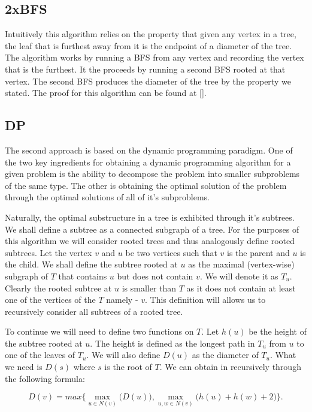 \subsection{2xBFS}

Intuitively this algorithm relies on the property that given any vertex in a tree, the leaf that is furthest away from it is the endpoint of a diameter of the tree. The algorithm works by running a BFS from any vertex and recording the vertex that is the furthest. It the proceeds by running a second BFS rooted at that vertex. The second BFS produces the diameter of the tree by the property we stated. The proof for this algorithm can be found at [].

\subsection{DP}

The second approach is based on the dynamic programming paradigm. One of the two key ingredients for obtaining a dynamic programming algorithm for a given problem is the ability to decompose the problem into smaller subproblems of the same type. The other is obtaining the optimal solution of the problem through the optimal solutions of all of it's subproblems. 

Naturally, the optimal substructure in a tree is exhibited through it's subtrees. We shall define a subtree as a connected subgraph of a tree. For the purposes of this algorithm we will consider rooted trees and thus analogously define rooted subtrees. Let the vertex $v$ and $u$ be two vertices such that $v$ is the parent and $u$ is the child. We shall define the subtree rooted at $u$ as the maximal (vertex-wise) subgraph of $T$ that contains $u$ but does not contain $v$. We will denote it as $T_u$. Clearly the rooted subtree at $u$ is smaller than $T$ as it does not contain at least one of the vertices of the $T$ namely - $v$. This definition will allows us to recursively consider all subtrees of a rooted tree.

To continue we will need to define two functions on $T$. Let $h(u)$ be the height of the subtree rooted at $u$. The height is defined as the longest path in $T_u$ from $u$ to one of the leaves of $T_u$. We will also define $D(u)$ as the diameter of $T_u$. What we need is $D(s)$ where $s$ is the root of $T$. We can obtain in recursively through the following formula:

$$ D(v) = max\bigg\{ \max\limits_{u \in N(v)}\bigg(D(u)\bigg), \max\limits_{u, w \in N(v)}\bigg(h(u) + h(w) + 2\bigg) \bigg\}. $$

